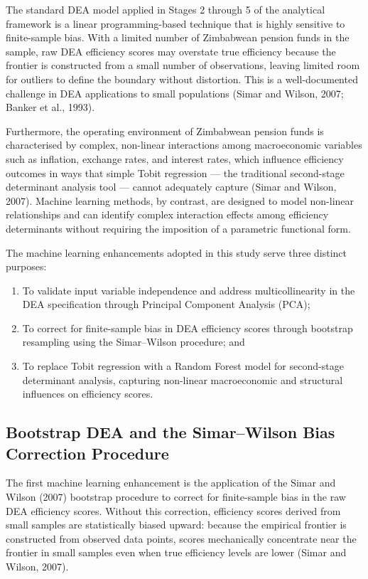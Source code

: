 \documentclass[12pt,a4paper]{article}
\begin{document}
The standard DEA model applied in Stages 2 through 5 of the analytical framework is a linear programming-based technique that is highly sensitive to finite-sample bias. With a limited number of Zimbabwean pension funds in the sample, raw DEA efficiency scores may overstate true efficiency because the frontier is constructed from a small number of observations, leaving limited room for outliers to define the boundary without distortion. This is a well-documented challenge in DEA applications to small populations (Simar and Wilson, 2007; Banker et al., 1993).

Furthermore, the operating environment of Zimbabwean pension funds is characterised by complex, non-linear interactions among macroeconomic variables such as inflation, exchange rates, and interest rates, which influence efficiency outcomes in ways that simple Tobit regression --- the traditional second-stage determinant analysis tool --- cannot adequately capture (Simar and Wilson, 2007). Machine learning methods, by contrast, are designed to model non-linear relationships and can identify complex interaction effects among efficiency determinants without requiring the imposition of a parametric functional form.

The machine learning enhancements adopted in this study serve three distinct purposes:

\begin{enumerate}[noitemsep]
    \item To validate input variable independence and address multicollinearity in the DEA specification through Principal Component Analysis (PCA);
    \item To correct for finite-sample bias in DEA efficiency scores through bootstrap resampling using the Simar--Wilson procedure; and
    \item To replace Tobit regression with a Random Forest model for second-stage determinant analysis, capturing non-linear macroeconomic and structural influences on efficiency scores.
\end{enumerate}

\subsection{Bootstrap DEA and the Simar--Wilson Bias Correction Procedure}

The first machine learning enhancement is the application of the Simar and Wilson (2007) bootstrap procedure to correct for finite-sample bias in the raw DEA efficiency scores. Without this correction, efficiency scores derived from small samples are statistically biased upward: because the empirical frontier is constructed from observed data points, scores mechanically concentrate near the frontier in small samples even when true efficiency levels are lower (Simar and Wilson, 2007).
\end{document}
